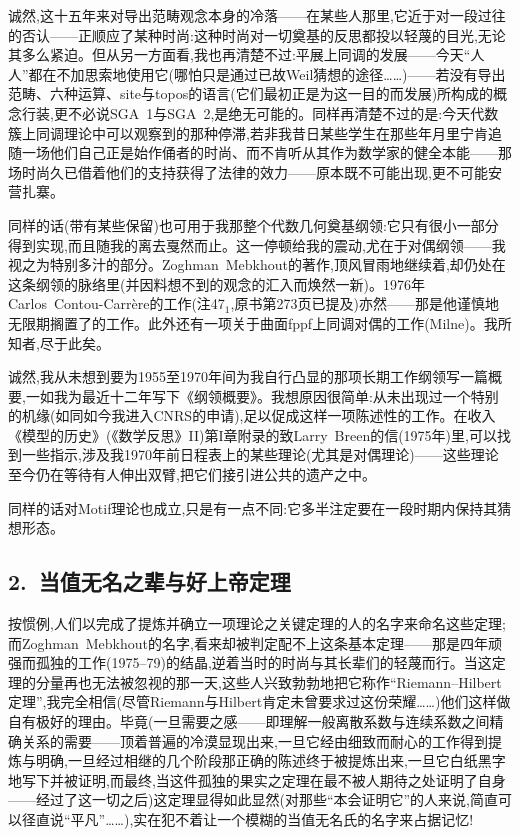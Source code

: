 \pmark 诚然,这十五年来对导出范畴观念本身的冷落——在某些人那里,它近于对一段过往的否认——正顺应了某种时尚:这种时尚对一切奠基的反思都投以轻蔑的目光,无论其多么紧迫。但从另一方面看,我也再清楚不过:平展上同调的发展——今天“人人”都在不加思索地使用它(哪怕只是通过已故Weil猜想的途径……)——若没有导出范畴、六种运算、site与topos的语言(它们最初正是为这一目的而发展)所构成的概念行装,更不必说SGA~1与SGA~2,是绝无可能的。同样再清楚不过的是:今天代数簇上同调理论中可以观察到的那种停滞,若非我昔日某些学生在那些年月里宁肯追随一场他们自己正是始作俑者的时尚、而不肯听从其作为数学家的健全本能——那场时尚久已借着他们的支持获得了法律的效力——原本既不可能出现,更不可能安营扎寨。


同样的话(带有某些保留)也可用于我那整个代数几何奠基纲领:它只有很小一部分得到实现,而且随我的离去戛然而止。这一停顿给我的震动,尤在于对偶纲领——我视之为特别多汁的部分。Zoghman~Mebkhout的著作,顶风冒雨地继续着,却仍处在这条纲领的脉络里(并因料想不到的观念的汇入而焕然一新)。1976年Carlos~Contou-Carrère的工作(注47$_{1}$,原书第273页已提及)亦然——那是他谨慎地无限期搁置了的工作。此外还有一项关于曲面fppf上同调对偶的工作(Milne)。我所知者,尽于此矣。

诚然,我从未想到要为1955至1970年间为我自行凸显的那项长期工作纲领写一篇概要,一如我为最近十二年写下《纲领概要》。我想原因很简单:从未出现过一个特别的机缘(如同如今我进入CNRS的申请),足以\dmark{}促成这样一项陈述性的工作。在收入《模型的历史》(《数学反思》II)第I章附录的致Larry~Breen的信(1975年)里,可以找到一些指示,涉及我1970年前日程表上的某些理论(尤其是对偶理论)——这些理论至今仍在等待有人伸出双臂,把它们接引进公共的遗产之中。


同样的话对Motif理论也成立,只是有一点不同:它多半注定要在一段时期内保持其猜想形态。

\subsection{2.~当值无名之辈与好上帝定理}


按惯例,人们以完成了提炼并确立一项理论之关键定理的人的名字来命名这些定理;而Zoghman~Mebkhout的名字,看来却被判定配不上这条基本定理——那是四年顽强而孤独的工作(1975--79)的结晶,逆着当时的时尚与其长辈们的轻蔑而行。当这定理的分量再也无法被忽视的那一天,这些人兴致勃勃地把它称作“Riemann--Hilbert定理”,我完全相信(尽管Riemann与Hilbert肯定未曾要求过这份荣耀……)他们这样做自有极好的理由。毕竟(一旦需要之感——即理解一般离散系数与连续系数之间精确关系的需要——顶着普遍的冷漠显现出来,一旦它经由细致而耐心的工作得到提炼与明确,一旦经过相继的几个阶段那正确的陈述终于被提炼出来,一旦它白纸黑字地写下并被证明,而最终,当这件孤独的果实之定理在最不被人期待之处证明了自身——经过了这一切之后)这定理显得如此显然(对那些“本会证明它”的人来说,简直可以径直说“平凡”……),实在犯不着让一个模糊的当值无名氏的名字来占据记忆!


